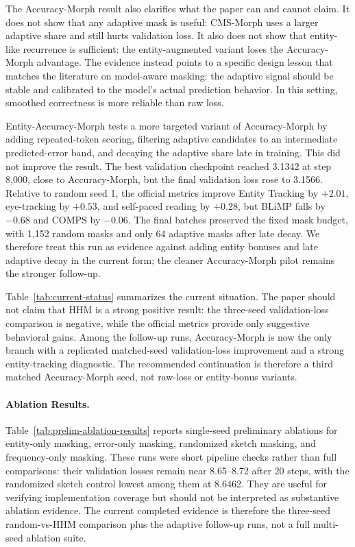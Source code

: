 The Accuracy-Morph result also clarifies what the paper can and cannot claim. It does not show that any adaptive mask is useful: CMS-Morph uses a larger adaptive share and still hurts validation loss. It also does not show that entity-like recurrence is sufficient: the entity-augmented variant loses the Accuracy-Morph advantage. The evidence instead points to a specific design lesson that matches the literature on model-aware masking: the adaptive signal should be stable and calibrated to the model's actual prediction behavior. In this setting, smoothed correctness is more reliable than raw loss.

Entity-Accuracy-Morph tests a more targeted variant of Accuracy-Morph by adding repeated-token scoring, filtering adaptive candidates to an intermediate predicted-error band, and decaying the adaptive share late in training. This did not improve the result. The best validation checkpoint reached 3.1342 at step 8{,}000, close to Accuracy-Morph, but the final validation loss rose to 3.1566. Relative to random seed 1, the official metrics improve Entity Tracking by $+2.01$, eye-tracking by $+0.53$, and self-paced reading by $+0.28$, but BLiMP falls by $-0.68$ and COMPS by $-0.06$. The final batches preserved the fixed mask budget, with 1{,}152 random masks and only 64 adaptive masks after late decay. We therefore treat this run as evidence against adding entity bonuses and late adaptive decay in the current form; the cleaner Accuracy-Morph pilot remains the stronger follow-up.

Table~\ref{tab:current-status} summarizes the current situation. The paper should not claim that HHM is a strong positive result: the three-seed validation-loss comparison is negative, while the official metrics provide only suggestive behavioral gains. Among the follow-up runs, Accuracy-Morph is now the only branch with a replicated matched-seed validation-loss improvement and a strong entity-tracking diagnostic. The recommended continuation is therefore a third matched Accuracy-Morph seed, not raw-loss or entity-bonus variants.

\paragraph{Ablation Results.}
Table~\ref{tab:prelim-ablation-results} reports single-seed preliminary ablations for entity-only masking, error-only masking, randomized sketch masking, and frequency-only masking. These runs were short pipeline checks rather than full comparisons: their validation losses remain near 8.65--8.72 after 20 steps, with the randomized sketch control lowest among them at 8.6462. They are useful for verifying implementation coverage but should not be interpreted as substantive ablation evidence. The current completed evidence is therefore the three-seed random-vs-HHM comparison plus the adaptive follow-up runs, not a full multi-seed ablation suite.

